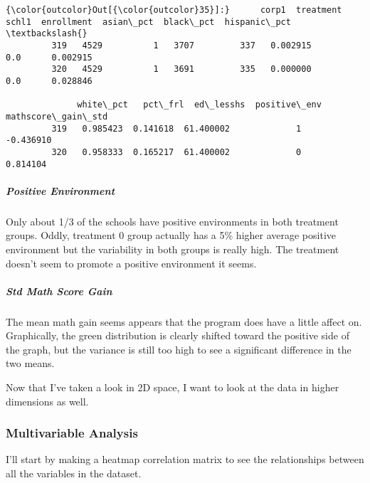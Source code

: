 \documentclass[11pt]{article}
\begin{document}
\begin{Verbatim}[commandchars=\\\{\}]
{\color{outcolor}Out[{\color{outcolor}35}]:}      corp1  treatment  schl1  enrollment  asian\_pct  black\_pct  hispanic\_pct  \textbackslash{}
         319   4529          1   3707         337   0.002915        0.0      0.002915   
         320   4529          1   3691         335   0.000000        0.0      0.028846   
         
              white\_pct   pct\_frl  ed\_lesshs  positive\_env  mathscore\_gain\_std  
         319   0.985423  0.141618  61.400002             1           -0.436910  
         320   0.958333  0.165217  61.400002             0            0.814104  
\end{Verbatim}
            
    \subparagraph{Positive Environment}\label{positive-environment}

Only about 1/3 of the schools have positive environments in both
treatment groups. Oddly, treatment 0 group actually has a 5\% higher
average positive environment but the variability in both groups is
really high. The treatment doesn't seem to promote a positive
environment it seems.

\subparagraph{Std Math Score Gain}\label{std-math-score-gain}

The mean math gain seems appears that the program does have a little
affect on. Graphically, the green distribution is clearly shifted toward
the positive side of the graph, but the variance is still too high to
see a significant difference in the two means.

Now that I've taken a look in 2D space, I want to look at the data in
higher dimensions as well.

    \subsubsection{Multivariable Analysis}\label{multivariable-analysis}

    I'll start by making a heatmap correlation matrix to see the
relationships between all the variables in the dataset.
\end{document}

